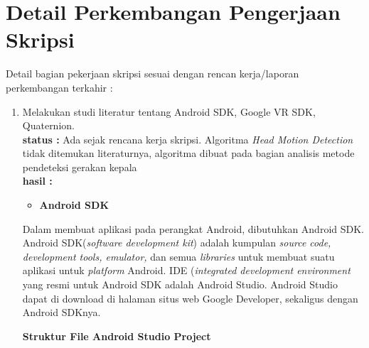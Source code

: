 \documentclass[a4paper,twoside]{article}
\begin{document}
\section{Detail Perkembangan Pengerjaan Skripsi}
Detail bagian pekerjaan skripsi sesuai dengan rencan kerja/laporan perkembangan terkahir :
	\begin{enumerate}
		\item Melakukan studi literatur tentang Android SDK, Google VR SDK, Quaternion.\\
		{\bf status :} Ada sejak rencana kerja skripsi. Algoritma \textit{Head Motion Detection} tidak ditemukan literaturnya, algoritma dibuat pada bagian analisis metode pendeteksi gerakan kepala\\
		{\bf hasil :} 
		\begin{itemize}
			\item \textbf{Android SDK} 
		\end{itemize} 
		Dalam membuat aplikasi pada perangkat Android, dibutuhkan Android SDK. Android SDK(\textit{software development kit}) adalah kumpulan \textit{source code, development tools, emulator,}\cite{developers2011android} dan semua \textit{libraries} untuk membuat suatu aplikasi untuk \textit{platform} Android. IDE (\textit{integrated development environment} yang resmi untuk Android SDK adalah Android Studio. Android Studio dapat di download di halaman situs web Google Developer\cite{developers2011android}, sekaligus dengan Android SDKnya.  
				  
				\textbf{Struktur File Android Studio Project} 
				

\end{enumerate}
\end{document}
